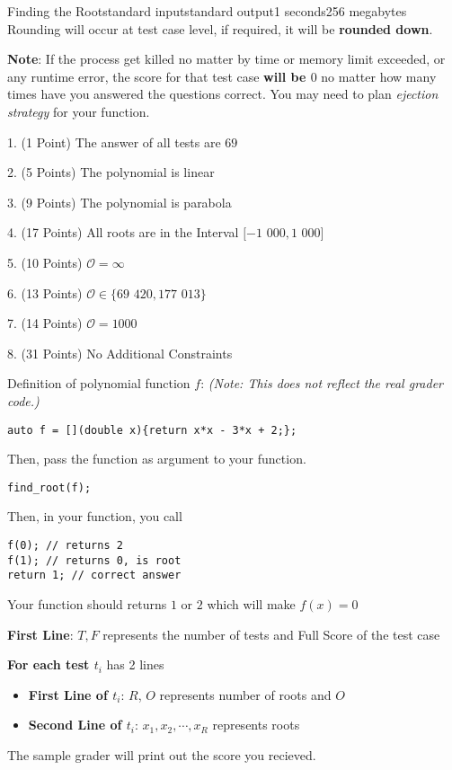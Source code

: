 \documentclass[11pt,a4paper]{article}
\begin{document}
\begin{problem}{Finding the Root}{standard input}{standard output}{1 seconds}{256 megabytes}
Rounding will occur at test case level, if required, it will be \textbf{rounded down}.

\textbf{Note}: If the process get killed no matter by time or memory limit exceeded,
or any runtime error, the score for that test case \textbf{will be $0$} no matter
how many times have you answered the questions correct. You may need to plan
\textit{ejection strategy} for your function.

\Subtasks

1. (1 Point) The answer of all tests are $69$

2. (5 Points) The polynomial is linear

3. (9 Points) The polynomial is parabola

4. (17 Points) All roots are in the Interval $[-1$ $000, 1$ $000]$

5. (10 Points) $\mathcal{O} = \infty$

6. (13 Points) $\mathcal{O} \in \{69$ $420, 177$ $013\}$

7. (14 Points) $\mathcal{O} = 1000$

8. (31 Points) No Additional Constraints

\Ex

Definition of polynomial function $f$: \textit{(Note: This does not reflect the real grader code.)}

\begin{verbatim}
auto f = [](double x){return x*x - 3*x + 2;};
\end{verbatim}

Then, pass the function as argument to your function.

\begin{verbatim}
find_root(f);
\end{verbatim}

Then, in your function, you call

\begin{verbatim}
f(0); // returns 2
f(1); // returns 0, is root
return 1; // correct answer
\end{verbatim}

Your function should returns $1$ or $2$ which will make $f(x)=0$

\SampleGrader

\textbf{First Line}: $T, F$ represents the number of tests and Full Score of the test case

\textbf{For each test $t_i$} has 2 lines

\begin{itemize}
\item \textbf{First Line of $t_i$}: $R$, $O$ represents number of roots and $O$
\item \textbf{Second Line of $t_i$}: $x_1, x_2, \cdots, x_R$ represents roots
\end{itemize}

The sample grader will print out the score you recieved.

\end{problem}
\end{document}
